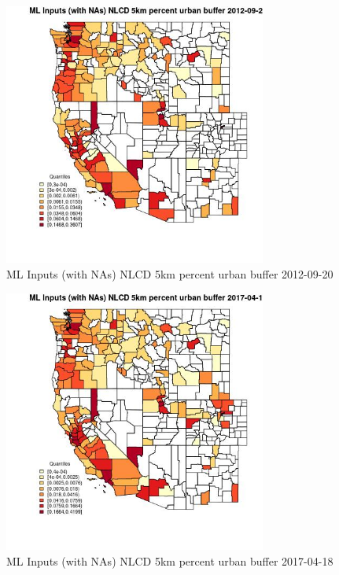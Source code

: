 \begin{figure} 
\centering  
\includegraphics[width=0.77\textwidth]{Code_Outputs/Report_ML_input_PM25_Step4_part_e_de_duplicated_aves_compiled_2019-05-14wNAs_CountyNLCD_5km_percent_urban_bufferMean2012-09-20_2012-09-20.jpg} 
\caption{\label{fig:Report_ML_input_PM25_Step4_part_e_de_duplicated_aves_compiled_2019-05-14wNAsCountyNLCD_5km_percent_urban_bufferMean2012-09-20_2012-09-20}ML Inputs (with NAs) NLCD 5km percent urban buffer 2012-09-20} 
\end{figure} 
 

\begin{figure} 
\centering  
\includegraphics[width=0.77\textwidth]{Code_Outputs/Report_ML_input_PM25_Step4_part_e_de_duplicated_aves_compiled_2019-05-14wNAs_CountyNLCD_5km_percent_urban_bufferMean2017-04-18_2017-04-18.jpg} 
\caption{\label{fig:Report_ML_input_PM25_Step4_part_e_de_duplicated_aves_compiled_2019-05-14wNAsCountyNLCD_5km_percent_urban_bufferMean2017-04-18_2017-04-18}ML Inputs (with NAs) NLCD 5km percent urban buffer 2017-04-18} 
\end{figure} 
 

